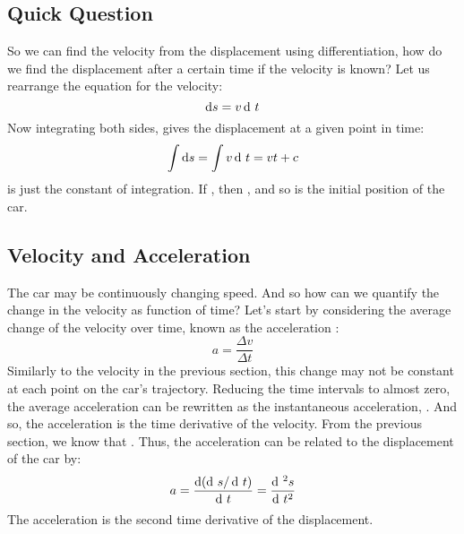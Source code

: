 \subsection*{Quick Question}
So we can find the velocity from the displacement using differentiation, how do we find the displacement after a certain time if the velocity is known? Let us rearrange the equation for the velocity:
 \begin{equation}
\operatorname{d}\! s = v \operatorname{d}\!\ t \label{inst_s}
\end{equation}
Now integrating both sides, gives the displacement at a given point in time:
  \begin{equation}
\int \operatorname{d}\! s = \int v \operatorname{d}\!\ t = vt + c
\end{equation}
 is just the constant of integration. If , then , and so  is the initial position of the car.

\subsection{Velocity and Acceleration}
The car may be continuously changing speed. And so how can we quantify the change in the velocity as function of time? Let's start by considering the average change of the velocity over time, known as the acceleration :
\begin{equation}
a = \frac{\Delta v}{\Delta t} 
\end{equation}
Similarly to the velocity in the previous section, this change may not be constant at each point on the car's trajectory. Reducing the time intervals to almost zero, the average acceleration can be rewritten as the instantaneous acceleration, . And so, the acceleration is the time derivative of the velocity. From the previous section, we know that . Thus, the acceleration can be related to the displacement of the car by:
\begin{equation}
a = \frac{\d \left(\d\ s/ \d\ t\right)}{\d\ t} = \frac{\d^{\ 2}s}{\d\ t^2} 
\end{equation}
 The acceleration is the second time derivative of the displacement. 

